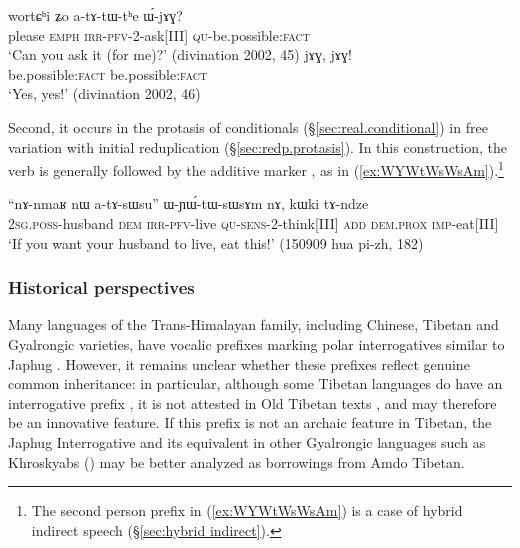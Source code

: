 \begin{exe}
\ex 
\begin{xlist}
\ex \label{ex:atAtWthe.WjAG}
 \gll wortɕʰi ʑo a-tɤ-tɯ-tʰe ɯ́-jɤɣ? \\
please \textsc{emph} \textsc{irr}-\textsc{pfv}-2-ask[III] \textsc{qu}-be.possible:\textsc{fact} \\ 
\glt `Can you ask it (for me)?' (divination 2002, 45)
\ex \label{ex:jAG.jAG}
 \gll jɤɣ, jɤɣ! \\
be.possible:\textsc{fact} be.possible:\textsc{fact} \\ 
\glt `Yes, yes!' (divination 2002, 46)
\end{xlist}
\end{exe}

Second, it occurs in the protasis of conditionals (§\ref{sec:real.conditional}) in free variation with initial reduplication (§\ref{sec:redp.protasis}). In this construction, the verb is generally followed by the additive marker , as in (\ref{ex:WYWtWsWsAm}).\footnote{The second person prefix  in (\ref{ex:WYWtWsWsAm}) is a case of hybrid indirect speech (§\ref{sec:hybrid indirect}). }
 
\begin{exe}
\ex \label{ex:WYWtWsWsAm}
 \gll ``nɤ-nmaʁ nɯ a-tɤ-sɯsu'' ɯ-ɲɯ́-tɯ-sɯsɤm nɤ, kɯki tɤ-ndze \\
 \textsc{2sg}.\textsc{poss}-husband \textsc{dem} \textsc{irr}-\textsc{pfv}-live \textsc{qu}-\textsc{sens}-2-think[III] \textsc{add} \textsc{dem}.\textsc{prox} \textsc{imp}-eat[III] \\
\glt `If you want your husband to live, eat this!' (150909 hua pi-zh, 182)
\end{exe}

\subsubsection{Historical perspectives} \label{sec:interrogative.e.history}

Many languages of the Trans-Himalayan family, including Chinese, Tibetan and Gyalrongic varieties, have vocalic prefixes marking polar interrogatives similar to Japhug  \citep{sunhk96yiwen}. However, it remains unclear whether these prefixes reflect genuine common inheritance: in particular, although some Tibetan languages do have an interrogative prefix , it is not attested in Old Tibetan texts \citep{hoshi12e}, and may therefore be an innovative feature. If this prefix is not an archaic feature in Tibetan,  the Japhug Interrogative  and its equivalent in other Gyalrongic languages such as Khroskyabs  (\citealt[340]{lai17khroskyabs}) may be better analyzed as borrowings from Amdo Tibetan.

